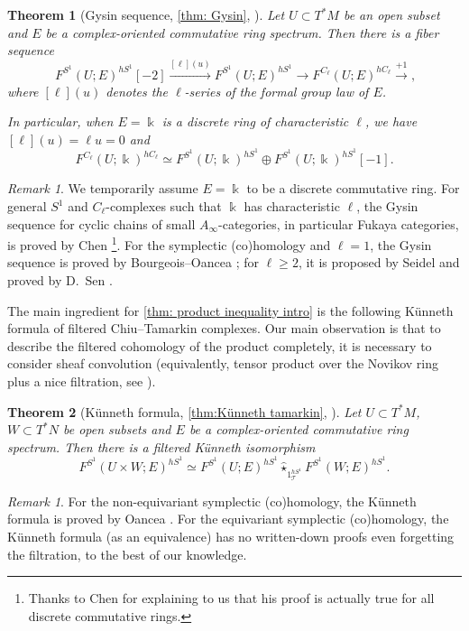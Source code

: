 \documentclass[11pt]{amsart}
\numberwithin{equation}{section}
\theoremstyle{plain}
\newtheorem{Thm}{Theorem}[section]
\theoremstyle{definition}
\theoremstyle{remark}
\newtheorem{RMK}[rmk]{Remark}
\newcommand{\sT} { {\mathscr{T}}}
\begin{document}
\begin{Thm}[Gysin sequence, \autoref{thm: Gysin}, {\cite[Theorem 1.7]{Li-Zhang26-1}}]
    Let $U \subset T^*M$ be an open subset and $E$ be a complex-oriented commutative ring spectrum. Then there is a fiber sequence
    \[\ F^{S^1}(U; E)^{hS^1} [-2]\xrightarrow{[\ell] (u)} F^{S^1}(U; E)^{hS^1}\to F^{C_\ell}(U; E)^{hC_\ell}  \xrightarrow{+1},\]
    where $[\ell](u)$ denotes the $\ell$-series of the formal group law of $E$. 
    
    In particular, when $E=\Bbbk$ is a discrete ring of characteristic $\ell$, we have $[\ell](u)=\ell u =0$ and
    \[F^{C_\ell}(U; \Bbbk)^{hC_\ell} \simeq F^{S^1}(U; \Bbbk)^{hS^1} \oplus F^{S^1}(U; \Bbbk)^{hS^1}[-1].\]
\end{Thm}
\begin{RMK}We temporarily assume $E=\Bbbk$ to be a discrete commutative ring. For general $S^1$ and $C_\ell$-complexes such that $\Bbbk$ has characteristic $\ell$, the Gysin sequence for cyclic chains of small $A_\infty$-categories, in particular Fukaya categories, is proved by Chen \cite{Chen1}\footnote{Thanks to Chen for explaining to us that his proof is actually true for all discrete commutative rings.}. For the symplectic (co)homology and $\ell = 1$, the Gysin sequence is proved by Bourgeois--Oancea \cite{Bourgeois-Oancea-17}; for $\ell \geq 2$, it is proposed by Seidel \cite[Section 2d]{Seidel-Equivariant} and proved by D.~Sen \cite{Sen2023}.
\end{RMK}

The main ingredient for \autoref{thm: product inequality intro} is the following Künneth formula of filtered Chiu--Tamarkin complexes. Our main observation is that to describe the filtered cohomology of the product completely, it is necessary to consider sheaf convolution (equivalently, tensor product over the Novikov ring plus a nice filtration, see \cite{APT-Tatsuki-Zhang}).

\begin{Thm}[Künneth formula, \autoref{thm:Künneth tamarkin}, {\cite[Theorem 1.8]{Li-Zhang26-1}}]
    Let $U \subset T^*M$, $W \subset T^*N$ be open subsets and $E$ be a complex-oriented commutative ring spectrum. Then there is a filtered Künneth isomorphism
    \[F^{S^1}(U \times W; E)^{hS^1} \simeq   F^{S^1} (U; E)^{hS^1} \widehat\star_{1_\sT^{hS^1}} F^{S^1} (W; E)^{hS^1}.\]
\end{Thm}
\begin{RMK}
    For the non-equivariant symplectic (co)homology, the Künneth formula is proved by Oancea \cite{Oancea-kunneth}. For the equivariant symplectic (co)homology, the Künneth formula (as an equivalence) has no written-down proofs even forgetting the filtration, to the best of our knowledge.
\end{RMK}
\end{document}
